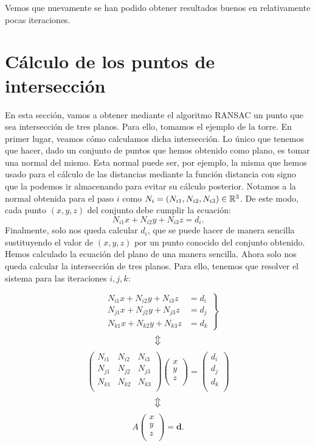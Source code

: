 Vemos que nuevamente se han podido obtener resultados buenos en relativamente pocas iteraciones.

\section{Cálculo de los puntos de intersección}
En esta sección, vamos a obtener mediante el algoritmo RANSAC un punto que sea intersección de tres planos. Para ello, tomamos el ejemplo de la torre. En primer lugar, veamos cómo calculamos dicha intersección. Lo único que tenemos que hacer, dado un conjunto de puntos que hemos obtenido como plano, es tomar una normal del mismo. Esta normal puede ser, por ejemplo, la misma que hemos usado para el cálculo de las distancias mediante la función distancia con signo que la podemos ir almacenando para evitar su cálculo posterior. Notamos a la normal obtenida para el paso $ i $ como $ N_i = (N_{i1}, N_{i2}, N_{i3}) \in \mathbb{R}^3$. De este modo, cada punto $ (x,y,z) $ del conjunto debe cumplir la ecuación:
\[
N_{i1} x + N_{i2} y + N_{i3} z = d_i.
\]
Finalmente, solo nos queda calcular $ d _i$, que se puede hacer de manera sencilla sustituyendo el valor de $ (x,y,z) $ por un punto conocido del conjunto obtenido. Hemos calculado la ecuación del plano de una manera sencilla. Ahora solo nos queda calcular la intersección de tres planos. Para ello, tenemos que resolver el sistema para las iteraciones $ i,j,k $:

\[
\left.
\begin{array}{rcl}
&N_{i1}x + N_{i2}y + N_{i3}z  &= d_i \\ 
&N_{j1}x + N_{j2}y + N_{j3}z  &= d_j \\
&N_{k1}x + N_{k2}y + N_{k3}z  &= d_k
\end{array}
\right\}
\]
\[
\big\Updownarrow
\]
\[
\begin{pmatrix}
N_{i1} & N_{i2} & N_{i3}\\
N_{j1} & N_{j2} & N_{j3}\\
N_{k1} & N_{k2} & N_{k3}\\
\end{pmatrix}
\begin{pmatrix}
x\\
y\\
z\\
\end{pmatrix}
=
\begin{pmatrix}
d_i\\
d_j\\
d_k\\
\end{pmatrix}
\]
\[
\big\Updownarrow
\]
\[
A \begin{pmatrix}
x\\
y\\
z\\
\end{pmatrix}
=
\mathit{\mathbf{d}}.
\]

